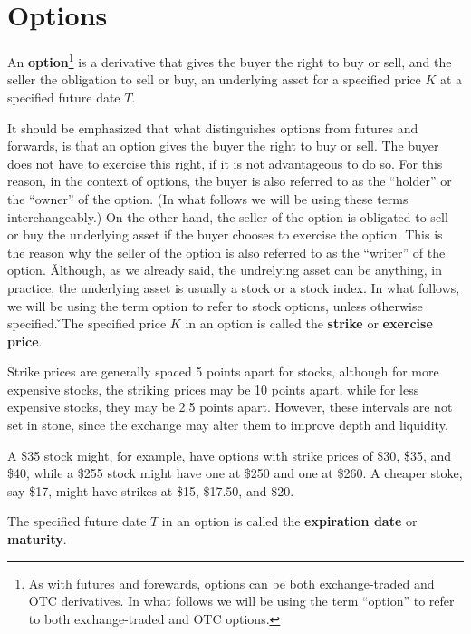 \section{Options}

\bd[Option]
An \textbf{option}\footnote{As with futures and forewards, options can be both exchange-traded and OTC derivatives. In
what follows we will be using the term ``option'' to refer to both exchange-traded and OTC options.} is a derivative
that gives the buyer the right to buy or sell, and the seller the obligation to sell or buy, an underlying asset for a
specified price $K$ at a specified future date $T$.
\ed

It should be emphasized that what distinguishes options from futures and forwards, is that an option gives the buyer
the right to buy or sell. The buyer does not have to exercise this right, if it is not advantageous to do so. For this
reason, in the context of options, the buyer is also referred to as the ``holder'' or the ``owner'' of the option. (In
what follows we will be using these terms interchangeably.) On the other hand, the seller of the option is obligated to
sell or buy the underlying asset if the buyer chooses to exercise the option. This is the reason why the seller of the
option is also referred to as the ``writer'' of the option. \v

Although, as we already said, the undrelying asset can be anything, in practice, the underlying asset is usually a
stock or a stock index. In what follows, we will be using the term option to refer to stock options, unless otherwise
specified. \v

The specified price $K$ in an option is called the \textbf{strike} or \textbf{exercise price}.
\ed

Strike prices are generally spaced 5 points apart for stocks, although for more expensive stocks, the striking prices
may be 10 points apart, while for less expensive stocks, they may be 2.5 points apart. However, these intervals are not
set in stone, since the exchange may alter them to improve depth and liquidity.

\be
A \$35 stock might, for example, have options with strike prices of \$30, \$35, and \$40, while a \$255 stock might
have one at \$250 and one at \$260. A cheaper stoke, say \$17, might have strikes at \$15, \$17.50, and \$20.
\ee

The specified future date $T$ in an option is called the \textbf{expiration date} or \textbf{maturity}.
\ed


